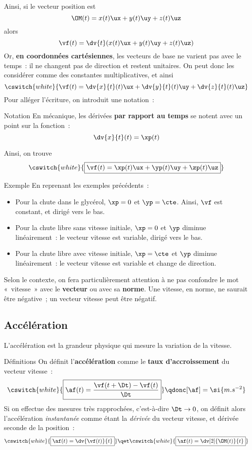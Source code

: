 \documentclass[../main/main.tex]{subfiles}
\begin{document}
Ainsi, si le vecteur position est
\[\OM(t) = x(t)\ux + y(t)\uy + z(t)\uz\]
alors
\[\vf(t) = \dv{t}(x(t)\ux + y(t)\uy + z(t)\uz)\]
Or, \textbf{en coordonnées cartésiennes}, les vecteurs de base ne varient pas
avec le temps~: il ne changent pas de direction et restent unitaires. On peut
donc les considérer comme des constantes multiplicatives, et ainsi
\[\cswitch{white}{\vf(t) = \dv{x}{t}(t)\ux + \dv{y}{t}(t)\uy + \dv{z}{t}(t)\uz}\]
Pour alléger l'écriture, on introduit une notation~:
\begin{rdefi}{Notation}
    En mécanique, les dérivées \textbf{par rapport au temps} se notent avec un
    point sur la fonction~:
    \[\dv{x}{t}(t) = \xp(t)\]
\end{rdefi}
Ainsi, on trouve
\[\cswitch{white}{\boxed{\vf(t) = \xp(t)\ux + \yp(t)\uy + \zp(t)\uz}}\]

\begin{rexem}{Exemple}
    En reprenant les exemples précédents~:
    \begin{itemize}
        \item Pour la chute dans le glycérol, $\xp = 0$ et $\yp = \cte$. Ainsi,
            $\vf$ est constant, et dirigé vers le bas.
        \item Pour la chute libre sans vitesse initiale, $\xp = 0$ et $\yp$
            diminue linéairement~: le vecteur vitesse est variable, dirigé vers
            le bas.
        \item Pour la chute libre avec vitesse initiale, $\xp = \cte$ et $\yp$
            diminue linéairement~: le vecteur vitesse est variable et change de
            direction.
    \end{itemize}
\end{rexem}

\begin{bimpo}{}
    Selon le contexte, on fera particulièrement attention à ne pas confondre le
    mot «~vitesse~» avec le \textbf{vecteur} ou avec sa \textbf{norme}. Une
    vitesse, en norme, ne saurait être négative~; un vecteur vitesse peut être
    négatif.
\end{bimpo}

\subsection{Accélération}
L'accélération est la grandeur physique qui mesure la variation de la vitesse.
\begin{bdefi}{Définitions}
    On définit l'\textbf{accélération} comme le \textbf{taux d'accroissement} du
    vecteur vitesse~:
    \[\cswitch{white}{\boxed{\af(t) = \frac{\vf(t+\Dt) - \vf(t)}{\Dt}}}
    \qdonc
    [\af] = \si{m.s^{-2}}\]
    Si on effectue des mesures très rapprochées, c'est-à-dire $\Dt \rightarrow
    0$, on définit alors l'accélération \textit{instantanée} comme étant la
    \textit{dérivée} du vecteur vitesse, et dérivée seconde de la position~:
    \[\cswitch{white}{\boxed{\af(t) = \dv{\vf(t)}{t}}}
    \qet
    \cswitch{white}{\boxed{\af(t) = \dv[2]{\OM(t)}{t}}}\]
\end{bdefi}
\end{document}

